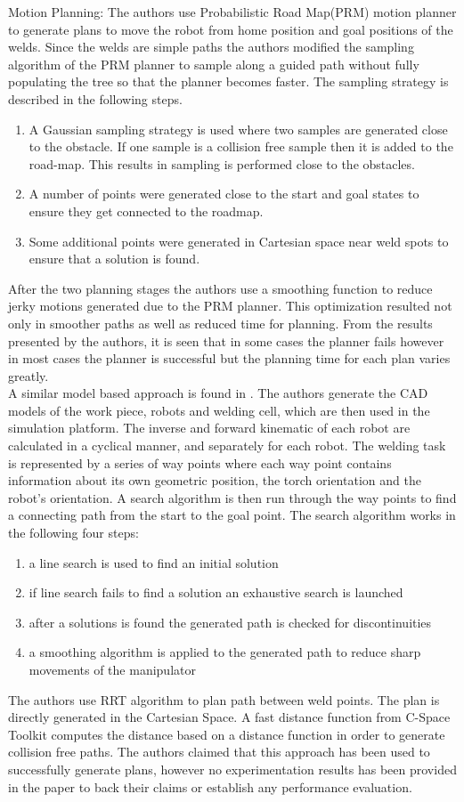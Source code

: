Motion Planning: The authors use Probabilistic Road Map(PRM) motion planner to generate plans to move the robot from home position and goal positions of the welds. Since the welds are simple paths the authors modified the sampling algorithm of the PRM planner to sample along a guided path without fully populating the tree so that the planner becomes faster. The sampling strategy is described in the following steps.
\begin{enumerate}
\item A Gaussian sampling strategy is used where two samples are generated close to the obstacle. If one sample is a collision free sample then it is added to the road-map. This results in sampling is performed close to the obstacles.
\item A number of points were generated close to the start and goal states to ensure they get connected to the roadmap.
\item Some additional points were generated in Cartesian space near weld spots to ensure that a solution is found.
\end{enumerate}
After the two planning stages the authors use a smoothing function to reduce jerky motions generated due to the PRM planner. This optimization resulted not only in smoother paths as well as reduced time for planning. From the results presented by the authors, it is seen that in some cases the planner fails however in most cases the planner is successful but the planning time for each plan varies greatly. \\
A similar model based approach is found in \cite{15}. The authors generate the CAD models of the work piece, robots and welding cell, which are then used in the simulation platform. The inverse and forward kinematic of each robot are calculated in a cyclical manner, and separately for each robot. The welding task is represented by a series of way points where each way point contains information about its own geometric position, the torch orientation and the robot's orientation. A search algorithm is then run through the way points to find a connecting path from the start to the goal point. The search algorithm works in the following four steps:
\begin{enumerate}
\item a line search is used to find an initial solution
\item if line search fails to find a solution an exhaustive search is launched
\item after a solutions is found the generated path is checked for discontinuities
\item a smoothing algorithm is applied to the generated path to reduce sharp movements of the manipulator
\end{enumerate}
The authors use RRT algorithm to plan path between weld points. The plan is directly generated in the Cartesian Space. A fast distance function from C-Space Toolkit computes the distance based on a distance function in order to generate collision free paths. The authors claimed that this approach has been used to successfully generate plans, however no experimentation results has been provided in the paper to back their claims or establish any performance evaluation. 
